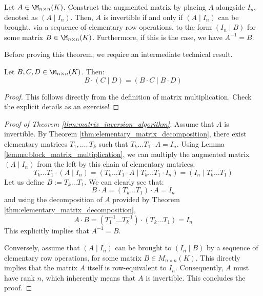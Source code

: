 \begin{theorem}
\label{thm:matrix_inversion_algorithm}
Let $A \in \M_{n \times n}(K)$. Construct the augmented matrix by placing $A$ alongside $I_n$, denoted as $(A \mid I_n)$. Then, $A$ is invertible if and only if $(A \mid I_n)$ can be brought, via a sequence of elementary row operations, to the form $(I_n \mid B)$ for some matrix $B \in \M_{n \times n}(K)$. Furthermore, if this is the case, we have $A^{-1} = B$.
\end{theorem}

Before proving this theorem, we require an intermediate technical result.

\begin{lemma}
\label{lemma:block_matrix_multiplication}
Let $B, C, D \in \M_{n \times n}(K)$. Then:
\begin{equation*}
    B \cdot \left(C \mid D\right) = \left(B \cdot C \mid B \cdot D\right)
\end{equation*}
\end{lemma}

\begin{proof}
This follows directly from the definition of matrix multiplication. Check the explicit details as an exercise!
\end{proof}

\begin{proof}[Proof of Theorem \ref{thm:matrix_inversion_algorithm}]
Assume that $A$ is invertible. By Theorem \ref{thm:elementary_matrix_decomposition}, there exist elementary matrices $T_1, \dots, T_k$ such that $T_k \dots T_1 \cdot A = I_n$. Using Lemma \ref{lemma:block_matrix_multiplication}, we can multiply the augmented matrix $(A \mid I_n)$ from the left by this chain of elementary matrices:
\begin{equation*}
    T_k \dots T_1 \cdot \left(A \mid I_n\right) = \left(T_k \dots T_1 \cdot A \mid T_k \dots T_1 \cdot I_n\right) = \left(I_n \mid T_k \dots T_1\right)
\end{equation*}
Let us define $B := T_k \dots T_1$. We can clearly see that:
\begin{equation*}
    B \cdot A = (T_k \dots T_1) \cdot A = I_n
\end{equation*}
and using the decomposition of $A$ provided by Theorem \ref{thm:elementary_matrix_decomposition},
\begin{equation*}
    A \cdot B = (T_1^{-1} \dots T_k^{-1}) \cdot (T_k \dots T_1) = I_n
\end{equation*}
This explicitly implies that $A^{-1} = B$.

Conversely, assume that $(A \mid I_n)$ can be brought to $(I_n \mid B)$ by a sequence of elementary row operations, for some matrix $B \in M_{n \times n}(K)$. This directly implies that the matrix $A$ itself is row-equivalent to $I_n$. Consequently, $A$ must have rank $n$, which inherently means that $A$ is invertible. This concludes the proof.
\end{proof}

